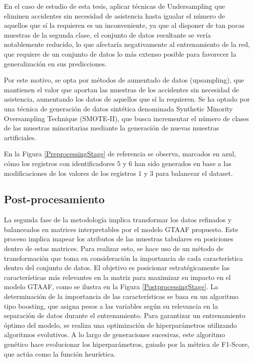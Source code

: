 \documentclass{uathesis-es}
\begin{document}
	En el caso de estudio de esta tesis, aplicar técnicas de Undersampling que eliminen accidentes sin necesidad de asistencia hasta igualar el número de aquellos que sí la requieren es un inconveniente, ya que al disponer de tan pocas muestras de la segunda clase, el conjunto de datos resultante se vería notablemente reducido, lo que afectaría negativamente al entrenamiento de la red, que requiere de un conjunto de datos lo más extenso posible para favorecer la generalización en sus predicciones.
	
	Por este motivo, se opta por métodos de aumentado de datos (upsampling), que mantienen el valor que aportan las muestras de los accidentes sin necesidad de asistencia, aumentando los datos de aquellos que sí la requieren. Se ha optado por una técnica de generación de datos sintética denominada Synthetic Minority Oversampling Technique (SMOTE-II), que busca incrementar el número de clases de las muestras minoritarias mediante la generación de nuevas muestras artificiales.
	
	En la Figura \ref{PreprocessingStage} de referencia se observa, marcados en azul, cómo los registros con identificadores $5$ y $6$ han sido generados en base a las modificaciones de los valores de los registros $1$ y $3$ para balancear el dataset.
	
	
	
	\subsection{Post-procesamiento}
	
	La segunda fase de la metodología implica transformar los datos refinados y balanceados en matrices interpretables por el modelo GTAAF propuesto. Este proceso implica mapear los atributos de las muestras tabulares en posiciones dentro de estas matrices. Para realizar esto, se hace uso de un método de transformación que toma en consideración la importancia de cada característica dentro del conjunto de datos. El objetivo es posicionar estratégicamente las características más relevantes en la matriz para maximizar su impacto en el modelo GTAAF, como se ilustra en la Figura \ref{PostprocessingStage}. La determinación de la importancia de las características se basa en un algoritmo tipo boosting, que asigna pesos a las variables según su relevancia en la separación de datos durante el entrenamiento. Para garantizar un entrenamiento óptimo del modelo, se realiza una optimización de hiperparámetros utilizando algoritmos evolutivos. A lo largo de generaciones sucesivas, este algoritmo genético hace evolucionar los hiperparámetros, guiado por la métrica de F1-Score, que actúa como la función heurística.
	
\end{document}

